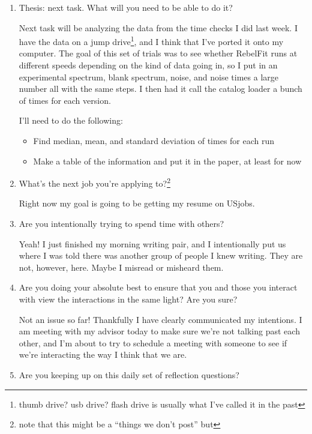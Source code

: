 \documentclass[12pt]{article}
\newcommand{\say}[1]{``#1''}
\renewcommand{\,}{\textsuperscript{,}}
\begin{document}
\begin{enumerate}
\item Thesis: next task. What will you need to be able to do it?

Next task will be analyzing the data from the time checks I did last week. I have the data on a jump drive\footnote{thumb drive? usb drive? flash drive is usually what I've called it in the past}, and I think that I've ported it onto my computer.  
The goal of this set of trials was to see whether RebelFit runs at different speeds depending on the kind of data going in, so I put in an experimental spectrum, blank spectrum, noise, and noise times a large number all with the same steps.  
I then had it call the catalog loader a bunch of times for each version.

I'll need to do the following:

\begin{itemize}

\item Find median, mean, and standard deviation of times for each run

\item Make a table of the information and put it in the paper, at least for now

\end{itemize}

\item What's the next job you're applying to?\footnote{note that this might be a \say{things we don't post} but}

Right now my goal is going to be getting my resume on USjobs.

\item Are you intentionally trying to spend time with others?

Yeah! I just finished my morning writing pair, and I intentionally put us where I was told there was another group of people I knew writing. They are not, however, here.  
Maybe I misread or misheard them.

\item Are you doing your absolute best to ensure that you and those you interact with view the interactions in the same light? Are you sure?

Not an issue so far! Thankfully I have clearly communicated my intentions.  
I am meeting with my advisor today to make sure we're not talking past each other, and I'm about to try to schedule a meeting with someone to see if we're interacting the way I think that we are.

\item Are you keeping up on this daily set of reflection questions?


\end{enumerate}
\end{document}
